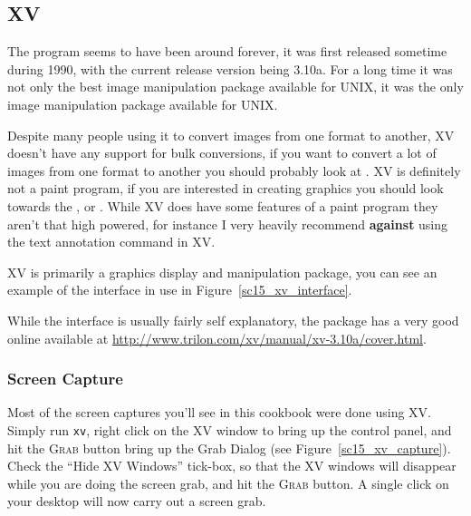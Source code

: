 \documentclass[twoside,11pt]{starlink}
\begin{document}
\subsection{XV\label{sc15_xv}}

The  program seems to
have been around forever, it was first released sometime during 1990,
with the current release version being 3.10a. For a long time it was
not only the best image manipulation package available for UNIX, it
was the only image manipulation package available for UNIX.

Despite many people using it to convert images from one format to
another, XV doesn't have any support for bulk conversions, if you want
to convert a lot of images from one format to another you should
probably look at . XV is definitely not
a paint program, if you are interested in creating graphics you should
look towards the ,  or . While XV
does have some features of a paint program they aren't that high
powered, for instance I very heavily recommend \textbf{against} using the
text annotation command in XV.

XV is primarily a graphics display and manipulation package, you can
see an example of the interface in use in
Figure~\ref{sc15_xv_interface}.


While the interface is usually fairly self explanatory, the package
has a very good online
available at \url{http://www.trilon.com/xv/manual/xv-3.10a/cover.html}.

\subsubsection{Screen Capture}

Most of the screen captures you'll see in this cookbook were done
using XV. Simply run \texttt{xv}, right click on the XV window to bring
up the control panel, and hit the \textsc{Grab} button bring up the Grab
Dialog (see Figure~\ref{sc15_xv_capture}). Check the ``Hide XV
Windows'' tick-box, so that the XV windows will disappear while you
are doing the screen grab, and hit the \textsc{Grab} button. A single
click on your desktop will now carry out a screen grab.
\end{document}
